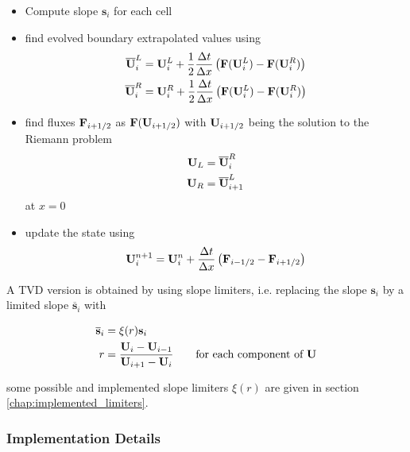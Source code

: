 \begin{itemize}
	\item 	Compute slope $\mathbf{s}_i$ for each cell
	\item 	find evolved boundary extrapolated values using 
			\begin{align*}
				\overline{\mathbf{U}}_i^L &= \mathbf{U}_i^L + \frac{1}{2} \frac{\Delta t}{\Delta x} \left( \mathbf{F}(\mathbf{U}_i^L) - \mathbf{F}(\mathbf{U}_i^R) \right)\\
				\overline{\mathbf{U}}_i^R &= \mathbf{U}_i^R + \frac{1}{2} \frac{\Delta t}{\Delta x} \left( \mathbf{F}(\mathbf{U}_i^L) - \mathbf{F}(\mathbf{U}_i^R) \right)
			\end{align*}
	\item 	find fluxes $\mathbf{F}_{i + 1/2}$ as $\mathbf{F}(\mathbf{U}_{i+1/2})$ with $\mathbf{U}_{i+1/2}$ being the solution to the Riemann problem 
			\begin{align}
				\mathbf{U}_L &= \overline{\mathbf{U}}_i^R\\
				\mathbf{U}_R &= \overline{\mathbf{U}}_{i+1}^L 
			\end{align}
			at $ x = 0$

	\item 	update the state using 
			\begin{equation}
				\mathbf{U}_i^{n+1} = \mathbf{U}_i^n + \frac{\Delta t}{\Delta x} \left( \mathbf{F}_{i-1/2} - \mathbf{F}_{i + 1/2} \right)
			\end{equation}
\end{itemize}




A TVD version is obtained by using slope limiters, i.e. replacing the slope $\mathbf{s}_i$ by a limited slope $\overline{\mathbf{s}}_i$ with

\begin{align*}
	\overline{\mathbf{s}}_i &= \xi(r) \mathbf{s}_i \\
	r &= \frac{\mathbf{U}_i - \mathbf{U}_{i-1}}{\mathbf{U}_{i+1} - \mathbf{U}_{i}} \quad\quad \text{for each component of }\mathbf{U}
\end{align*} 

some possible and implemented slope limiters $\xi(r)$ are given in section \ref{chap:implemented_limiters}.
















\subsubsection{Implementation Details}




